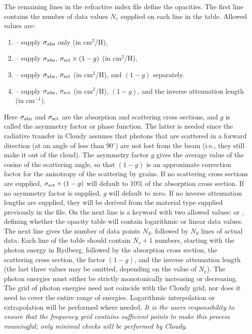 The remaining lines in the refractive index file define the opacities. The
first line contains the number of data values $N_v$ supplied on each line in
the table. Allowed values are:
\begin{enumerate}
\item
-- supply $\sigma_{\rm abs}$ only (in cm$^2$/H),
\item
-- supply $\sigma_{\rm abs}$, $\sigma_{\rm sct} \times (1-g)$ (in cm$^2$/H),
\item
-- supply $\sigma_{\rm abs}$, $\sigma_{\rm sct}$ (in cm$^2$/H), and $(1-g)$
   separately.
\item
-- supply $\sigma_{\rm abs}$, $\sigma_{\rm sct}$ (in cm$^2$/H), $(1-g)$,
   and the inverse attenuation length (in cm$^{-1}$).
\end{enumerate}
Here $\sigma_{\rm abs}$ and $\sigma_{\rm sct}$ are the absorption and
scattering cross sections, and $g$ is called the asymmetry factor or phase
function. The latter is needed since the radiative transfer in Cloudy assumes
that photons that are scattered in a forward direction (at an angle of less
than 90$^\circ$) are not lost from the beam (i.e., they still make it out of
the cloud). The asymmetry factor $g$ gives the average value of the cosine of
the scattering angle, so that $(1-g)$ is an approximate correction factor for
the anisotropy of the scattering by grains. If no scattering cross sections
are supplied, $\sigma_{\rm sct} \times (1-g)$ will default to 10\% of the
absorption cross section. If no asymmetry factor is supplied, $g$ will default
to zero. If no inverse attenuation lengths are supplied, they will be derived
from the material type supplied previously in the file. On the next line is a
keyword with two allowed values:  or ,
defining whether the opacity table will contain logarithmic or linear data
values. The next line gives the number of data points $N_d$, followed by $N_d$
lines of actual data. Each line of the table should contain $N_v+1$ numbers,
starting with the photon energy in Rydberg, followed by the absorption cross
section, the scattering cross section, the factor $(1-g)$, and the inverse
attenuation length (the last three values may be omitted, depending on the
value of $N_v$). The photon energies must either be strictly monotonically
increasing or decreasing. The grid of photon energies need not coincide with
the Cloudy grid, nor does it need to cover the entire range of energies.
Logarithmic interpolation or extrapolation will be performed where needed.
{\em It is the users responsibility to ensure that the frequency grid contains
  sufficient points to make this process meaningful; only minimal checks will
  be performed by Cloudy. }

